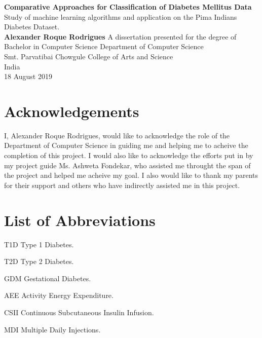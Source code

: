 \documentclass[12pt]{article}
\begin{document}
\begin{titlepage}
    \begin{center}
        \vspace*{1cm} 
        \Huge
        \textbf{Comparative Approaches for Classification of Diabetes Mellitus Data} 
        \vspace{0.5cm}
        \normalsize
        \vspace{0cm}
        \\
        Study of machine learning algorithms and application on the Pima Indians Diabetes Dataset. 
        \vspace{1.5cm} 
        \\
        \textbf{Alexander Roque Rodrigues} 
        \vfill 
        A dissertation presented for the degree of\\
        Bachelor in Computer Science 
        \vspace{0.8cm}
        \Large
        Department of Computer Science\\        
        Smt. Parvatibai Chowgule College of Arts and Science\\
        India\\
        18 August 2019 
    \end{center}
\end{titlepage}
\Huge
\newpage
\huge
\normalsize
\tableofcontents

\newpage
\part{Acknowledgements}
I, Alexander Roque Rodrigues, would like to acknowledge the role of the Department of Computer Science in guiding me and helping me to acheive the completion of this project. I would also like to acknowledge the efforts put in by my project guide Ms. Ashweta Fondekar, who assisted me throught the span of the project and helped me acheive my goal. I also would like to thank my parents for their support and others who have indirectly assisted me in this project.


\newpage
{}
 
\part{List of Abbreviations}
\begin{abbrv}
 
\item[T1D]			Type 1 Diabetes.
\item[T2D]			Type 2 Diabetes.
\item[GDM]			Gestational Diabetes.
\item[AEE]			Activity Energy Expenditure.
\item[CSII] 		Continuous Subcutaneous Insulin Infusion.
\item[MDI] 			Multiple Daily Injections.
\end{abbrv}
\end{document}
